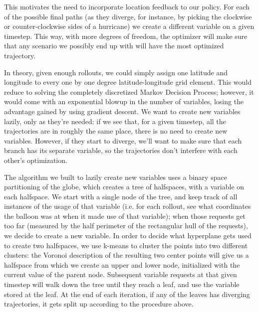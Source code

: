 \documentclass[11pt]{scrartcl} %
\begin{document}
This motivates the need to incorporate location feedback to our policy. For each of the possible final paths (as they diverge, for instance, by picking the clockwise or counter-clockwise sides of a hurricane) we create a different variable on a given timestep. This way, with more degrees of freedom, the optimizer will make sure that any scenario we possibly end up with will have the most optimized trajectory.

In theory, given enough rollouts, we could simply assign one latitude and longitude to every one by one degree latitude-longitude grid element. This would reduce to solving the completely discretized Markov Decision Process; however, it would come with an exponential blowup in the number of variables, losing the advantage gained by using gradient descent. We want to create new variables lazily, only as they're needed: if we see that, for a given timestep, all the trajectories are in roughly the same place, there is no need to create new variables. However, if they start to diverge, we'll want to make sure that each branch has its separate variable, so the trajectories don't interfere with each other's optimization.

The algorithm we built to lazily create new variables uses a binary space partitioning of the globe, which creates a tree of halfspaces, with a variable on each halfspace. We start with a single node of the tree, and keep track of all instances of the usage of that variable (i.e. for each rollout, see what coordinates the balloon was at when it made use of that variable); when those requests get too far (measured by the half perimeter of the rectangular hull of the requests), we decide to create a new variable. In order to decide what hyperplane gets used to create two halfspaces, we use k-means to cluster the points into two different clusters: the Voronoi description of the resulting two center points will give us a halfspace from which we create an upper and lower node, initialized with the current value of the parent node. Subsequent variable requests at that given timestep will walk down the tree until they reach a leaf, and use the variable stored at the leaf. At the end of each iteration, if any of the leaves has diverging trajectories, it gets split up according to the procedure above.
\end{document}
